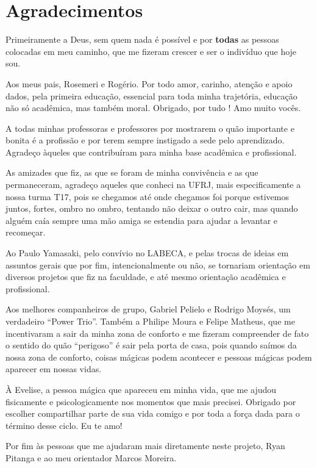 \chapter*{Agradecimentos} Primeiramente a Deus, sem
quem nada é possível e por \mbox{\textbf{todas}} as pessoas colocadas em meu caminho, que
me fizeram crescer e ser o indivíduo que hoje sou.

Aos meus pais, Rosemeri e Rogério. Por todo amor, carinho, atenção e
apoio dados, pela primeira educação, essencial para toda minha
trajetória, educação não só acadêmica, mas também moral. Obrigado, por tudo ! Amo muito vocês.

A todas minhas professoras e professores por 
 mostrarem o quão importante e bonita é a profissão e por terem sempre
 instigado a sede pelo aprendizado. Agradeço àqueles que contribuíram para
 minha base acadêmica e profissional.

As amizades que fiz, as que se foram de minha convivência e
   as que permaneceram, agradeço aqueles que conheci na UFRJ, mais especificamente a nossa turma T17,
   pois se chegamos até onde chegamos foi porque estivemos juntos, fortes, ombro
   no ombro, tentando não deixar o outro cair, mas quando alguém caía
   sempre uma mão amiga se estendia para ajudar a levantar e recomeçar. 

Ao Paulo Yamasaki, pelo convívio no LABECA, e pelas
   trocas de ideias em assuntos gerais que por fim, intencionalmente ou não, se
   tornariam orientação em diversos projetos que fiz na faculdade, e até mesmo
   orientação acadêmica e profissional. 

Aos melhores companheiros de grupo, Gabriel Pelielo e Rodrigo Moysés, um
verdadeiro ``Power Trio''. Também a Philipe Moura e Felipe Matheus, que me
incentivaram a sair da minha zona de conforto e me fizeram compreender de fato o sentido do quão
``perigoso'' é sair pela porta de casa, pois quando saímos da nossa zona de
conforto, coisas mágicas podem acontecer e pessoas mágicas podem aparecer em
nossas vidas.

À Evelise, a pessoa mágica que apareceu em minha vida, que me ajudou
fisicamente e psicologicamente nos momentos que mais precisei. Obrigado por escolher compartilhar parte de sua
vida comigo e por toda a força dada para o término desse ciclo. Eu te amo!  

Por fim às pessoas que me ajudaram mais diretamente neste projeto, Ryan
Pitanga e ao meu orientador Marcos Moreira.

